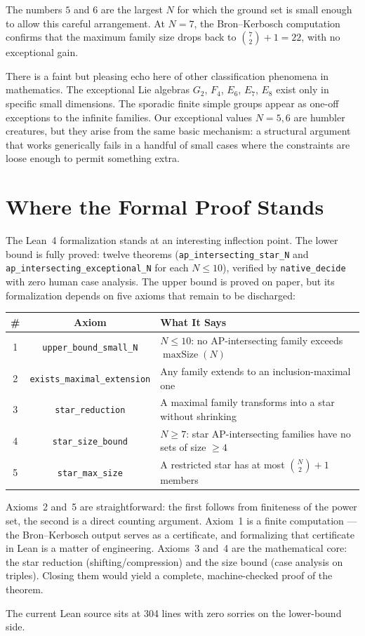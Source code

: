 \documentclass[11pt,a4paper]{article}
\theoremstyle{definition}
\newcommand{\CN}{\binom{N}{2}}
\begin{document}
The numbers $5$ and $6$ are the largest $N$ for which the ground set is small enough
to allow this careful arrangement. At $N=7$, the Bron--Kerbosch computation confirms
that the maximum family size drops back to $\binom{7}{2}+1 = 22$, with no exceptional
gain.

There is a faint but pleasing echo here of other classification phenomena in
mathematics. The exceptional Lie algebras $G_2$, $F_4$, $E_6$, $E_7$, $E_8$ exist
only in specific small dimensions. The sporadic finite simple groups appear as
one-off exceptions to the infinite families. Our exceptional values $N=5,6$ are
humbler creatures, but they arise from the same basic mechanism: a structural
argument that works generically fails in a handful of small cases where the
constraints are loose enough to permit something extra.

\section{Where the Formal Proof Stands}

The Lean~4 formalization stands at an interesting inflection point. The lower
bound is fully proved: twelve theorems (\texttt{ap\_intersecting\_star\_N}
and \texttt{ap\_intersecting\_exceptional\_N} for each $N \leq 10$),
verified by \texttt{native\_decide} with zero human case analysis. The upper
bound is proved on paper, but its formalization depends on five axioms that
remain to be discharged:

\begin{center}
\small
\begin{tabular}{ccl}
\toprule
\# & Axiom & What It Says \\
\midrule
1 & \texttt{upper\_bound\_small\_N}
    & $N \leq 10$: no AP-intersecting family exceeds
      $\operatorname{maxSize}(N)$ \\
2 & \texttt{exists\_maximal\_extension}
    & Any family extends to an inclusion-maximal one \\
3 & \texttt{star\_reduction}
    & A maximal family transforms into a star without shrinking \\
4 & \texttt{star\_size\_bound}
    & $N \geq 7$: star AP-intersecting families have no sets
      of size $\geq 4$ \\
5 & \texttt{star\_max\_size}
    & A restricted star has at most $\CN + 1$ members \\
\bottomrule
\end{tabular}
\end{center}

Axioms~2 and~5 are straightforward: the first follows from finiteness of the power
set, the second is a direct counting argument. Axiom~1 is a finite computation ---
the Bron--Kerbosch output serves as a certificate, and formalizing that certificate
in Lean is a matter of engineering. Axioms~3 and~4 are the mathematical core: the
star reduction (shifting/compression) and the size bound (case analysis on triples).
Closing them would yield a complete, machine-checked proof of the theorem.

The current Lean source sits at 304 lines with zero sorries on the lower-bound side.
\end{document}
